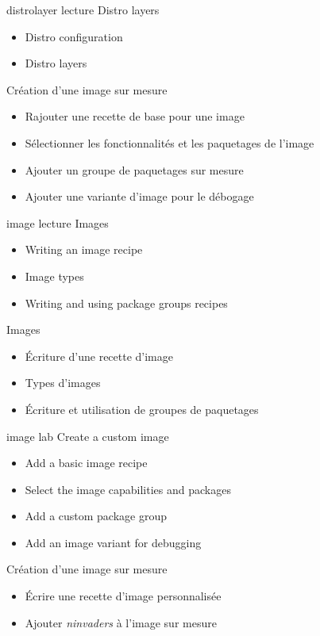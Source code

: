 {distrolayer}
{lecture}
{Distro layers}
{
  \begin{itemize}
  \item Distro configuration
  \item Distro layers
  \end{itemize}
}
{Création d'une image sur mesure}
{
  \begin{itemize}
  \item Rajouter une recette de base pour une image
  \item Sélectionner les fonctionnalités et les paquetages de l'image
  \item Ajouter un groupe de paquetages sur mesure
  \item Ajouter une variante d'image pour le débogage
  \end{itemize}
}

{image}
{lecture}
{Images}
{
  \begin{itemize}
  \item Writing an image recipe
  \item Image types
  \item Writing and using package groups recipes
  \end{itemize}
}
{Images}
{
  \begin{itemize}
  \item Écriture d’une recette d’image
  \item Types d’images
  \item Écriture et utilisation de groupes de paquetages
  \end{itemize}
}

{image}
{lab}
{Create a custom image}
{
  \begin{itemize}
  \item Add a basic image recipe
  \item Select the image capabilities and packages
  \item Add a custom package group
  \item Add an image variant for debugging
  \end{itemize}
}
{Création d'une image sur mesure}
{
  \begin{itemize}
  \item Écrire une recette d'image personnalisée
  \item Ajouter {\em ninvaders} à l'image sur mesure
  \end{itemize}
}

